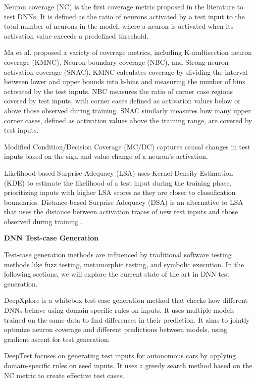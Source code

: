 Neuron coverage (NC) \cite{deepxplore} is the first coverage metric proposed in the literature to test DNNs. It is defined as the ratio of neurons activated by a test input to the total number of neurons in the model, where a neuron is activated when its activation value exceeds a predefined threshold.

Ma et al. \cite{deepguage} proposed a variety of coverage metrics, including K-multisection neuron coverage (KMNC), Neuron boundary coverage (NBC), and Strong neuron activation coverage (SNAC). KMNC calculates coverage by dividing the interval between lower and upper bounds into k-bins and measuring the number of bins activated by the test inputs. NBC measures the ratio of corner case regions covered by test inputs, with corner cases defined as activation values below or above those observed during training. SNAC similarly measures how many upper corner cases, defined as activation values above the training range, are covered by test inputs.

Modified Condition/Decision Coverage (MC/DC) \cite{SunY} captures causal changes in test inputs based on the sign and value change of a neuron's activation.

Likelihood-based Surprise Adequacy (LSA) uses Kernel Density Estimation (KDE) to estimate the likelihood of a test input during the training phase, prioritizing inputs with higher LSA scores as they are closer to classification boundaries. Distance-based Surprise Adequacy (DSA) is an alternative to LSA that uses the distance between activation traces of new test inputs and those observed during training \cite{KimJ}.

\smallskip\noindent%
\textbf{DNN Test-case Generation}

Test-case generation methods are influenced by traditional software testing methods like fuzz testing, metamorphic testing, and symbolic execution. In the following sections, we will explore the current state of the art in DNN test generation.

DeepXplore \cite{deepxplore} is a whitebox test-case generation method that checks how different DNNs behave using domain-specific rules on inputs. It uses multiple models trained on the same data to find differences in their prediction. It aims to jointly optimize neuron coverage and different predictions between models, using gradient ascent for test generation.

DeepTest \cite{deeptest} focuses on generating test inputs for autonomous cars by applying domain-specific rules on seed inputs. It uses a greedy search method based on the NC metric to create effective test cases.

